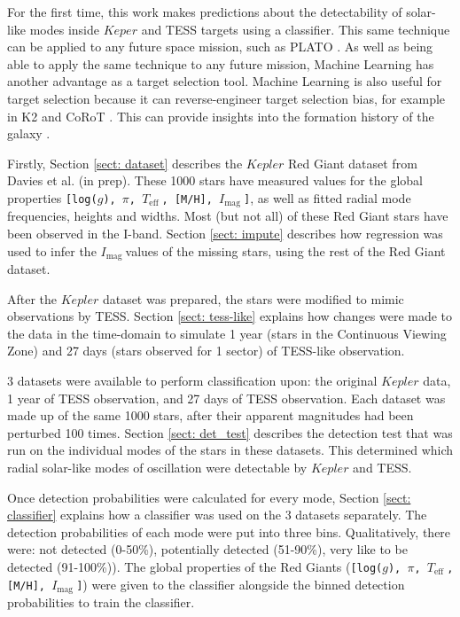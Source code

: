 \documentclass[a4paper,fleqn,usenatbib,useAMS]{mnras}
\newcommand{\teff}{\ensuremath{T_{\textrm{eff}}\:}}
\newcommand{\imag}{\ensuremath{I_{\textrm{mag}}\:}}
\begin{document}
For the first time, this work makes predictions about the detectability of solar-like modes inside $Keper$ and TESS targets using a classifier. This same technique can be applied to any future space mission, such as PLATO \citep{rauer_plato_2014}. As well as being able to apply the same technique to any future mission, Machine Learning has another advantage as a target selection tool. Machine Learning is also useful for target selection because it can reverse-engineer target selection bias, for example in K2 \citep{lund_K2P2_2015} and CoRoT \citep{baglin_corot:_2006}. This can provide insights into the formation history of the galaxy \citep{thomas_galactic_2017}.

Firstly, Section \ref{sect: dataset} describes the $Kepler$ Red Giant dataset from Davies et al. (in prep). These 1000 stars have measured values for the global properties \texttt{[log($g$), $\pi$, \teff, [M/H], \imag]}, as well as fitted radial mode frequencies, heights and widths. Most (but not all) of these Red Giant stars have been observed in the I-band. Section \ref{sect: impute} describes how regression was used to infer the \imag values of the missing stars, using the rest of the Red Giant dataset.

After the $Kepler$ dataset was prepared, the stars were modified to mimic observations by TESS. Section \ref{sect: tess-like} explains how changes were made to the data in the time-domain to simulate 1 year (stars in the Continuous Viewing Zone) and 27 days (stars observed for 1 sector) of TESS-like observation.

3 datasets were available to perform classification upon: the original $Kepler$ data, 1 year of TESS observation, and 27 days of TESS observation. Each dataset was made up of the same 1000 stars, after their apparent magnitudes had been perturbed 100 times. Section \ref{sect: det_test} describes the detection test that was run on the individual modes  of the stars in these datasets. This determined which radial solar-like modes of oscillation were detectable by $Kepler$ and TESS.

Once detection probabilities were calculated for every mode, Section \ref{sect: classifier} explains how a classifier was used on the 3 datasets separately. The detection probabilities of each mode were put into three bins. Qualitatively, there were: not detected (0-50\%), potentially detected (51-90\%), very like to be detected (91-100\%)). The global properties of the Red Giants (\texttt{[log($g$), $\pi$, \teff, [M/H], \imag]}) were given to the classifier alongside the binned detection probabilities to train the classifier.
\end{document}
